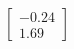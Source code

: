 \documentclass[preview]{standalone}
\begin{document}
\begin{align*}
\begin{bmatrix} -0.24 \\ 1.69 \end{bmatrix}
\end{align*}
\end{document}
